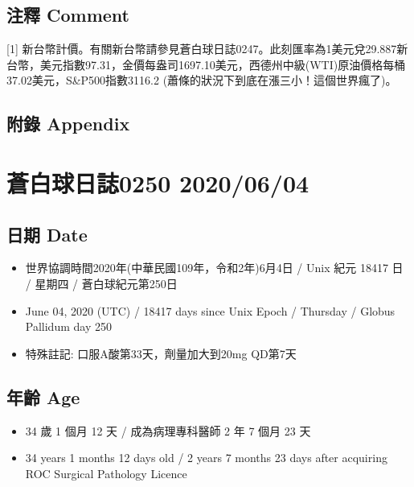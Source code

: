 \documentclass[a5paper, 11pt
]{book}
\providecommand{\tightlist}{%
  \setlength{\itemsep}{0pt}\setlength{\parskip}{0pt}}
\begin{document}
\hypertarget{ux6ce8ux91cb-comment-2}{%
\subsection{注釋 Comment}\label{ux6ce8ux91cb-comment-2}}

{[}1{]}
新台幣計價。有關新台幣請參見蒼白球日誌0247。此刻匯率為1美元兌29.887新台幣，美元指數97.31，金價每盎司1697.10美元，西德州中級(WTI)原油價格每桶37.02美元，S\&P500指數3116.2
(蕭條的狀況下到底在漲三小！這個世界瘋了)。

\hypertarget{ux9644ux9304-appendix-2}{%
\subsection{附錄 Appendix}\label{ux9644ux9304-appendix-2}}

\hypertarget{ux84bcux767dux7403ux65e5ux8a8c0250-20200604}{%
\section{蒼白球日誌0250
2020/06/04}\label{ux84bcux767dux7403ux65e5ux8a8c0250-20200604}}

\hypertarget{ux65e5ux671f-date-3}{%
\subsection{日期 Date}\label{ux65e5ux671f-date-3}}

\begin{itemize}
\tightlist
\item
  世界協調時間2020年(中華民國109年，令和2年)6月4日 / Unix 紀元 18417 日
  / 星期四 / 蒼白球紀元第250日
\item
  June 04, 2020 (UTC) / 18417 days since Unix Epoch / Thursday / Globus
  Pallidum day 250
\item
  特殊註記: 口服A酸第33天，劑量加大到20mg QD第7天
\end{itemize}

\hypertarget{ux5e74ux9f61-age-3}{%
\subsection{年齡 Age}\label{ux5e74ux9f61-age-3}}

\begin{itemize}
\tightlist
\item
  34 歲 1 個月 12 天 / 成為病理專科醫師 2 年 7 個月 23 天
\item
  34 years 1 months 12 days old / 2 years 7 months 23 days after
  acquiring ROC Surgical Pathology Licence
\end{itemize}
\end{document}
